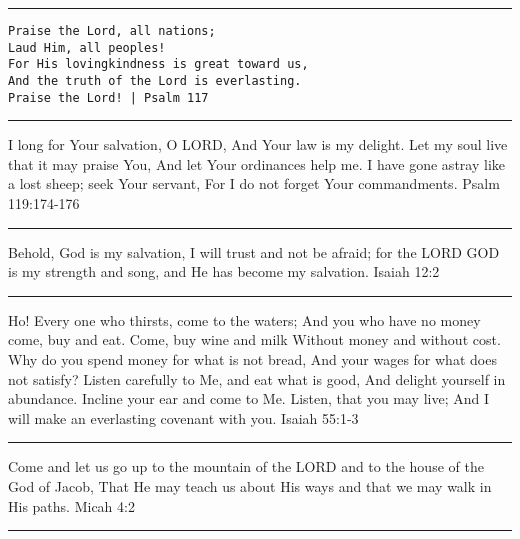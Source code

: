 \documentclass[]{book}
\begin{document}
\begin{center}\rule{0.5\linewidth}{\linethickness}\end{center}

\begin{verbatim}
Praise the Lord, all nations;
Laud Him, all peoples!
For His lovingkindness is great toward us,
And the truth of the Lord is everlasting.
Praise the Lord! | Psalm 117
\end{verbatim}

\begin{center}\rule{0.5\linewidth}{\linethickness}\end{center}

I long for Your salvation, O LORD, And Your law is my delight. Let my soul live that it may praise You, And let Your ordinances help me. I have gone astray like a lost sheep; seek Your servant, For I do not forget Your commandments. \textbar{} Psalm 119:174-176

\begin{center}\rule{0.5\linewidth}{\linethickness}\end{center}

Behold, God is my salvation, I will trust and not be afraid; for the LORD GOD is my strength and song, and He has become my salvation. \textbar{} Isaiah 12:2

\begin{center}\rule{0.5\linewidth}{\linethickness}\end{center}

Ho! Every one who thirsts, come to the waters; And you who have no money come, buy and eat. Come, buy wine and milk Without money and without cost. Why do you spend money for what is not bread, And your wages for what does not satisfy? Listen carefully to Me, and eat what is good, And delight yourself in abundance. Incline your ear and come to Me. Listen, that you may live; And I will make an everlasting covenant with you. \textbar{} Isaiah 55:1-3

\begin{center}\rule{0.5\linewidth}{\linethickness}\end{center}

Come and let us go up to the mountain of the LORD and to the house of the God of Jacob, That He may teach us about His ways and that we may walk in His paths. \textbar{} Micah 4:2

\begin{center}\rule{0.5\linewidth}{\linethickness}\end{center}
\end{document}

